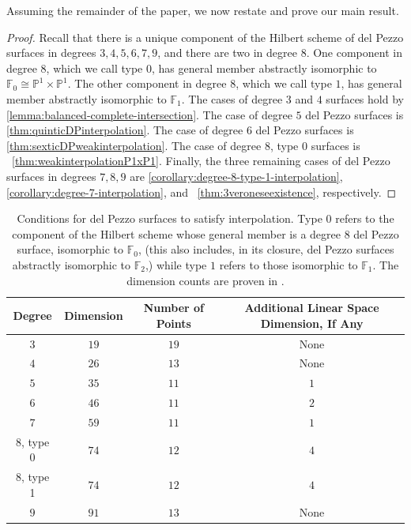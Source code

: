 \documentclass[reqno, 11pt]{amsart}
\theoremstyle{definition}
\theoremstyle{remark}
\numberwithin{equation}{section}
\numberwithin{thm}{section}
\numberwithin{prop}{section}
\numberwithin{lem}{section}
\numberwithin{cor}{section}
\numberwithin{conj}{section}
\numberwithin{defn}{section}
\theoremstyle{plain}
\theoremstyle{definition}
\newcommand\bp{{\mathbb P}}
\begin{document}
Assuming the remainder of the paper, we now restate and prove
our main result.

\main*
\begin{proof}
Recall that there is a unique component of the Hilbert
scheme of del Pezzo surfaces in
degrees $3, 4, 5, 6, 7, 9$, and there are two in degree $8$.
One component in degree $8$, which we call type $0$,
has general member abstractly isomorphic to $\mathbb F_0 \cong \bp^1 \times \bp^1$.
The other component in degree $8$, which we call type $1$,
has general member abstractly isomorphic to $\mathbb F_1$.
The cases of degree $3$ and $4$ surfaces hold by
\autoref{lemma:balanced-complete-intersection}.
The case of degree $5$ del Pezzo surfaces is
\autoref{thm:quinticDPinterpolation}.
The case of degree $6$ del Pezzo surfaces is
\autoref{thm:sexticDPweakinterpolation}.
The case of degree $8$, type $0$
surfaces is ~\autoref{thm:weakinterpolationP1xP1}.
Finally, the three remaining cases of del Pezzo surfaces in
degrees $7,8,9$ are 
\autoref{corollary:degree-8-type-1-interpolation},
\autoref{corollary:degree-7-interpolation},
and
~\autoref{thm:3veroneseexistence},
respectively.
\end{proof}

\begin{table}
\begin{tabular}
	{| c || c | c | c |}
	\hline
	Degree & Dimension & Number of Points & Additional Linear Space Dimension, If Any \\
	\hline
	\hline

	$3$ & $19$ & $19$ & None \\	\hline

	$4$ & $26$ & $13$ & None \\	\hline
	
	$5$ & $35$ & $11$ & $1$ \\	\hline
	
	$6$ & $46$ & $11$ & $2$ \\	\hline
	
	$7$ & $59$ & $11$ & $1$ \\	\hline
	
	$8$, type 0 & $74$ & $12$ & $4$ \\	\hline
	
	$8$, type 1 & $74$ & $12$ & $4$ \\	\hline
	
	$9$ & $91$ & $13$ & None \\	\hline
\end{tabular}
\vspace{.5cm}
\caption{Conditions for del Pezzo surfaces to satisfy interpolation.
Type $0$ refers to the component of the Hilbert scheme whose
general member is a degree $8$ del Pezzo surface, isomorphic to $\mathbb F_0$,
(this also includes, in its closure, del Pezzo surfaces abstractly
isomorphic to $\mathbb F_2$,)
while type $1$ refers to those isomorphic to $\mathbb F_1$.
The dimension counts are proven in \cite[Lemma 2.3]{coskun:the-enumerative-geometry-of-del-Pezzo-surfaces-via-degenerations}.
}
\label{table:del-Pezzo-conditions}
\end{table}
\end{document}
